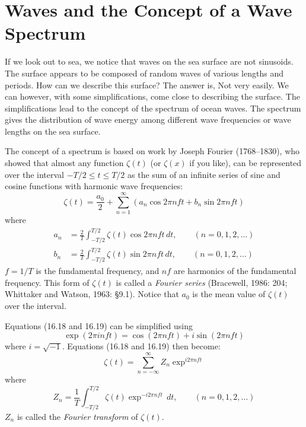 \section{Waves and the Concept of a Wave Spectrum}
If we look out to sea, we notice that
waves on the sea surface are not sinusoids. The surface appears to be
composed of random waves of various lengths and periods. How can we
describe this surface? The answer is, Not very easily. We can however,
with some simplifications, come close to describing the surface. The
simplifications lead to the concept of the spectrum of ocean
waves. The spectrum gives the distribution of wave energy among
different wave frequencies or wave lengths on the sea surface.

The concept of a spectrum is based on work by Joseph Fourier
(1768--1830), who showed that almost any function $\zeta (t)$ (or
$\zeta (x)$ if you like), can be represented over the interval $-T/2
\le t \le T/2$ as the sum of an infinite series of sine and cosine
functions with harmonic wave frequencies:
\begin{equation}
\zeta (t) = \frac{a_0}{2} + \sum_{n=1}^{\infty} (a_n \cos 2\pi nft + b_n \sin
2\pi nft)
\end{equation}
where
\begin{subequations}
\begin{align}
a_n &= \frac{2}{T} \int_{-T/2}^{T/2} \zeta (t) \cos 2\pi nft \, dt, \qquad
(n=0,1,2,\ldots) \\
b_n &= \frac{2}{T} \int_{-T/2}^{T/2} \zeta (t) \sin 2\pi nft \, dt, \qquad
(n=0,1,2,\ldots)
\end{align}
\end{subequations}
$f = 1/ T$ is the fundamental frequency, and $nf$ are harmonics of the
fundamental frequency. This form of $\zeta (t)$ is called a
\textit{Fourier series} (Bracewell, 1986: 204;
Whittaker and Watson, 1963: \S 9.1). Notice that $a_0$ is the mean
value of $\zeta (t)$ over the interval.

Equations (16.18 and 16.19) can be simplified using
\begin{equation}
\exp (2\pi inft) = \cos (2\pi nft) + i \sin (2\pi nft)
\end{equation}
where $i = \sqrt{-1}$. Equations (16.18 and 16.19) then become:
\begin{equation}
\zeta (t) = \sum_{n=-\infty}^{\infty} Z_n \exp ^{i2\pi nft}
\end{equation}
where
\begin{equation}
Z_n = \frac{1}{T} \int_{-T/2}^{T/2} \zeta (t) \exp ^{-i2\pi nft} \, dt, \qquad
(n=0,1,2,\ldots)
\end{equation}
$Z_n$ is called the \textit{Fourier transform}  of $\zeta (t)$.

